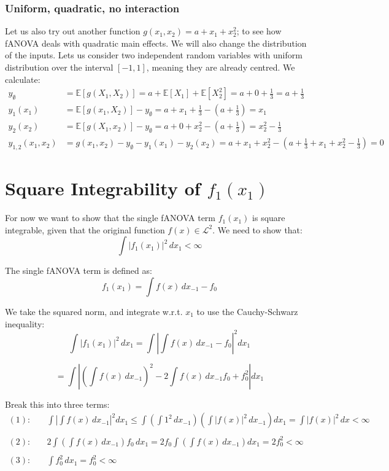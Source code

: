\subsubsection*{Uniform, quadratic, no interaction}
Let us also try out another function $g(x_1, x_2) = a + x_1 + x_2^2$; to see how fANOVA deals with quadratic main effects. 
We will also change the distribution of the inputs. Lets us consider two independent random variables with uniform distribution over the interval \([-1, 1]\), meaning they are already centred. We calculate:
\begin{align*}
y_\emptyset &= \mathbb{E}[g(X_1, X_2)] = a + \mathbb{E}[X_1] + \mathbb{E}[X_2^2] = a + 0 + \tfrac{1}{3} = a + \tfrac{1}{3} \\
y_1(x_1) &= \mathbb{E}[g(x_1, X_2)] - y_\emptyset = a + x_1 + \tfrac{1}{3} - \left(a + \tfrac{1}{3}\right) = x_1 \\
y_2(x_2) &= \mathbb{E}[g(X_1, x_2)] - y_\emptyset = a + 0 + x_2^2 - \left(a + \tfrac{1}{3}\right) = x_2^2 - \tfrac{1}{3} \\
y_{1,2}(x_1, x_2) &= g(x_1, x_2) - y_\emptyset - y_1(x_1) - y_2(x_2) = a + x_1 + x_2^2 - \left(a + \tfrac{1}{3} + x_1 + x_2^2 - \tfrac{1}{3}\right) = 0
\end{align*}



\section*{Square Integrability of \( f_1(x_1) \)}

For now we want to show that the single fANOVA term \( f_1(x_1) \) is square integrable, given that the original function $f(x) \in \mathcal{L}^2$. We need to show that:
\[
\int |f_1(x_1)|^2 \, dx_1 < \infty
\]

The single fANOVA term is defined as:
\[
f_1(x_1) = \int f(x) \, dx_{-1} - f_0
\]

We take the squared norm, and integrate w.r.t. \( x_1 \) to use the Cauchy-Schwarz inequality:
\[
\int |f_1(x_1)|^2 \, dx_1 
= \int \left| \int f(x) \, dx_{-1} - f_0 \right|^2 dx_1
\]

\[
= \int | (\int f(x) \, dx_{-1})^2 
- 2 \int f(x) \, dx_{-1} f_0 
+ f_0^2 | dx_1
\]

Break this into three terms:
\begin{align*}
(1): &\quad \int \left| \int f(x) \, dx_{-1} \right|^2 dx_1 
\leq \int \left( \int 1^2 \, dx_{-1} \right) \left( \int |f(x)|^2 \, dx_{-1} \right) dx_1 
= \int |f(x)|^2 \, dx < \infty \\
\\
(2): &\quad 2 \int \left( \int f(x) \, dx_{-1} \right) f_0 \, dx_1 
= 2 f_0 \int \left( \int f(x) \, dx_{-1} \right) dx_1 
= 2 f_0^2 < \infty \\
\\
(3): &\quad \int f_0^2 \, dx_1 = f_0^2 < \infty
\end{align*}

